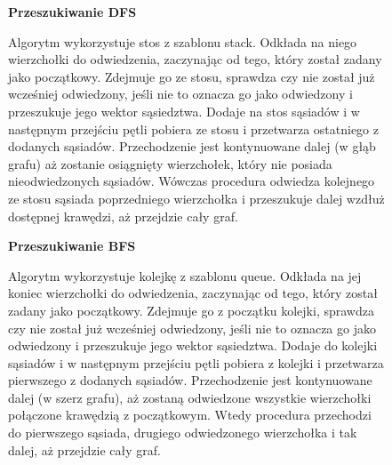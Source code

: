 \documentclass[a4paper,11pt]{report}
\begin{document}
\begin{figure}
  \begin{center}
  \textbf{Przeszukiwanie DFS}
\\
\begin{flushleft}

Algorytm wykorzystuje stos z szablonu stack. Odkłada na niego wierzchołki do odwiedzenia, zaczynając od tego, który został zadany jako początkowy. Zdejmuje go ze stosu, sprawdza czy nie został już wcześniej odwiedzony, jeśli nie to oznacza go jako odwiedzony i przeszukuje jego wektor sąsiedztwa. Dodaje na stos sąsiadów i w następnym przejściu pętli pobiera ze stosu i przetwarza ostatniego z dodanych sąsiadów. Przechodzenie jest kontynuowane dalej (w głąb grafu) aż zostanie osiągnięty wierzchołek, który nie posiada nieodwiedzonych sąsiadów. Wówczas procedura odwiedza kolejnego ze stosu sąsiada poprzedniego wierzchołka i przeszukuje dalej wzdłuż dostępnej krawędzi, aż przejdzie cały graf.

\end{flushleft}
  \end{center}
\end{figure}

\begin{figure}
  \begin{center}
  \textbf{Przeszukiwanie BFS}
\\
\begin{flushleft}

Algorytm wykorzystuje kolejkę z szablonu queue. Odkłada na jej koniec wierzchołki do odwiedzenia, zaczynając od tego, który został zadany jako początkowy. Zdejmuje go z początku kolejki, sprawdza czy nie został już wcześniej odwiedzony, jeśli nie to oznacza go jako odwiedzony i przeszukuje jego wektor sąsiedztwa. Dodaje do kolejki sąsiadów i w następnym przejściu pętli pobiera z kolejki i przetwarza pierwszego z dodanych sąsiadów. Przechodzenie jest kontynuowane dalej (w szerz grafu), aż zostaną odwiedzone wszystkie wierzchołki połączone krawędzią z początkowym. Wtedy procedura przechodzi do pierwszego sąsiada, drugiego odwiedzonego wierzchołka i tak dalej, aż przejdzie cały graf.

\end{flushleft}
  \end{center}
\end{figure}
\end{document}
